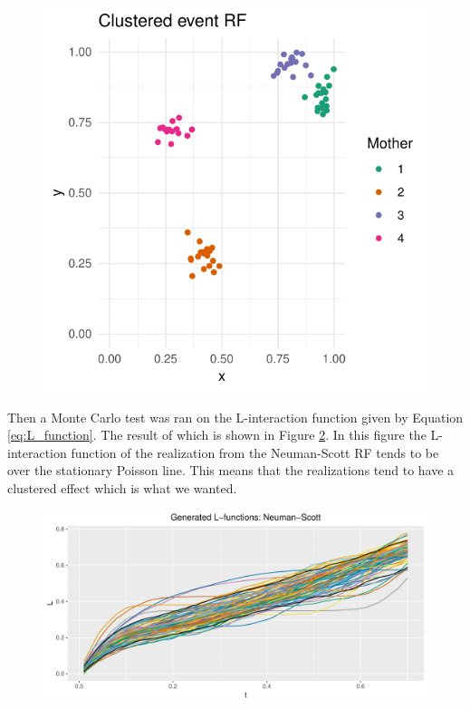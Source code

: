 \begin{figure}
    \centering
    \includegraphics[scale=0.95]{figures/cluster_event_rf.pdf}
    \caption{}
    \label{fig:cluster_event_rf}
\end{figure}
Then a Monte Carlo test was ran on the L-interaction function given by Equation \ref{eq:L_function}. The result of which is shown in Figure \ref{fig:gen_ns_l}. In this figure the L-interaction function of the realization from the Neuman-Scott RF tends to be over the stationary Poisson line. This means that the realizations tend to have a clustered effect which is what we wanted. 
\begin{figure}
    \centering
    \includegraphics[scale=0.95]{figures/gen_ns_l.pdf}
    \caption{}
    \label{fig:gen_ns_l}
\end{figure}
